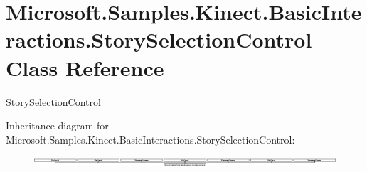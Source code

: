 \hypertarget{class_microsoft_1_1_samples_1_1_kinect_1_1_basic_interactions_1_1_story_selection_control}{\section{Microsoft.\-Samples.\-Kinect.\-Basic\-Interactions.\-Story\-Selection\-Control Class Reference}
\label{class_microsoft_1_1_samples_1_1_kinect_1_1_basic_interactions_1_1_story_selection_control}
}


\hyperlink{class_microsoft_1_1_samples_1_1_kinect_1_1_basic_interactions_1_1_story_selection_control}{Story\-Selection\-Control}  


Inheritance diagram for Microsoft.\-Samples.\-Kinect.\-Basic\-Interactions.\-Story\-Selection\-Control\-:\begin{figure}[H]
\begin{center}
\leavevmode
\includegraphics[height=0.410256cm]{class_microsoft_1_1_samples_1_1_kinect_1_1_basic_interactions_1_1_story_selection_control}
\end{center}
\end{figure}
